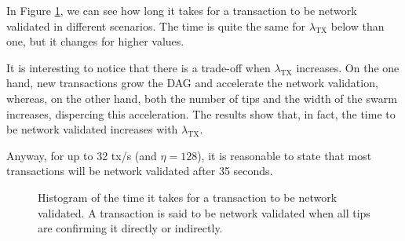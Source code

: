 In Figure \ref{fig:hathor-network-validated}, we can see how long it takes for a transaction to be network validated in different scenarios. The time is quite the same for $\lambda_\text{TX}$ below than one, but it changes for higher values.

It is interesting to notice that there is a trade-off when $\lambda_\text{TX}$ increases. On the one hand, new transactions grow the DAG and accelerate the network validation, whereas, on the other hand, both the number of tips and the width of the swarm increases, dispercing this acceleration. The results show that, in fact, the time to be network validated increases with $\lambda_\text{TX}$.

Anyway, for up to 32 tx/s (and $\eta=128$), it is reasonable to state that most transactions will be network validated after 35 seconds.

\begin{figure}[!htb]
\centering
{}


\caption{Histogram of the time it takes for a transaction to be network validated. A transaction is said to be network validated when all tips are confirming it directly or indirectly. \label{fig:hathor-network-validated}}
\end{figure}


